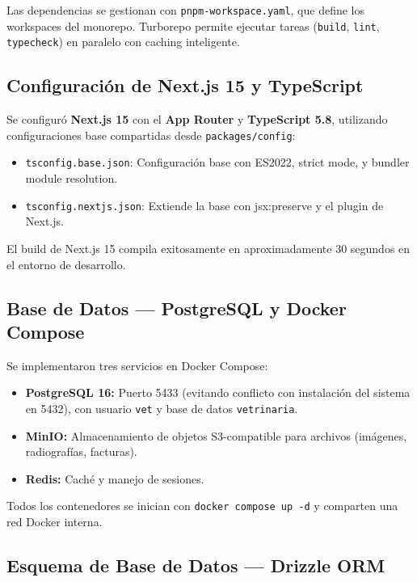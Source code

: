\documentclass[12pt,a4paper]{article}
\begin{document}
Las dependencias se gestionan con \texttt{pnpm-workspace.yaml}, que define los
workspaces del monorepo. Turborepo permite ejecutar tareas (\texttt{build},
\texttt{lint}, \texttt{typecheck}) en paralelo con caching inteligente.

\subsection{Configuración de Next.js 15 y TypeScript}

Se configuró \textbf{Next.js 15} con el \textbf{App Router} y \textbf{TypeScript 5.8},
utilizando configuraciones base compartidas desde \texttt{packages/config}:

\begin{itemize}[leftmargin=*]
    \item \texttt{tsconfig.base.json}: Configuración base con ES2022, strict mode,
          y bundler module resolution.
    \item \texttt{tsconfig.nextjs.json}: Extiende la base con jsx:preserve y
          el plugin de Next.js.
\end{itemize}

El build de Next.js 15 compila exitosamente en aproximadamente 30 segundos
en el entorno de desarrollo.

\subsection{Base de Datos — PostgreSQL y Docker Compose}

Se implementaron tres servicios en Docker Compose:

\begin{itemize}[leftmargin=*]
    \item \textbf{PostgreSQL 16:} Puerto 5433 (evitando conflicto con instalación
          del sistema en 5432), con usuario \texttt{vet} y base de datos
          \texttt{vetrinaria}.
    \item \textbf{MinIO:} Almacenamiento de objetos S3-compatible para archivos
          (imágenes, radiografías, facturas).
    \item \textbf{Redis:} Caché y manejo de sesiones.
\end{itemize}

Todos los contenedores se inician con \texttt{docker compose up -d} y comparten
una red Docker interna.

\subsection{Esquema de Base de Datos — Drizzle ORM}
\end{document}
